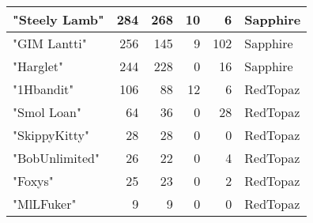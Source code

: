 \documentclass{article}
\begin{document}
\begin{table}[htbp]
\begin{tabular}{|l|r|r|r|r|l|}
"Steely Lamb" & 284 & 268 & 10 & 6 & Sapphire \\ \hline
"GIM Lantti" & 256 & 145 & 9 & 102 & Sapphire \\ \hline
"Harglet" & 244 & 228 & 0 & 16 & Sapphire \\ \hline
"1Hbandit" & 106 & 88 & 12 & 6 & RedTopaz \\ \hline
"Smol Loan" & 64 & 36 & 0 & 28 & RedTopaz \\ \hline
"SkippyKitty" & 28 & 28 & 0 & 0 & RedTopaz \\ \hline
"BobUnlimited" & 26 & 22 & 0 & 4 & RedTopaz \\ \hline
"Foxys" & 25 & 23 & 0 & 2 & RedTopaz \\ \hline
"MlLFuker" & 9 & 9 & 0 & 0 & RedTopaz \\ \hline
\end{tabular}
\end{table}
\end{document}
